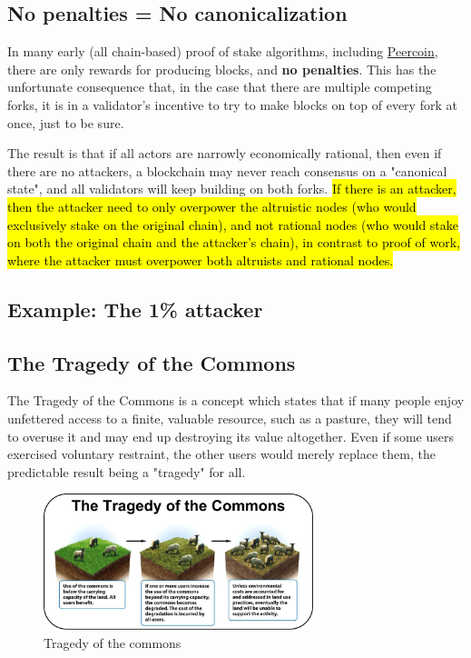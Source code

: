 \subsection{No penalties = No canonicalization}

In many early (all chain-based) proof of stake algorithms, including \href{https://www.peercoin.net/}{Peercoin}, there are only rewards for producing blocks, and \textbf{no penalties}. This has the unfortunate consequence that, in the case that there are multiple competing forks, it is in a validator's incentive to try to make blocks on top of every fork at once, just to be sure.

The result is that if all actors are narrowly economically rational, then even if there are no attackers, a blockchain may never reach consensus on a "canonical state", and all validators will keep building on both forks. \hl{If there is an attacker, then the attacker need to only overpower the altruistic nodes (who would exclusively stake on the original chain), and not rational nodes (who would stake on both the original chain and the attacker's chain), in contrast to proof of work, where the attacker must overpower both altruists and rational nodes.}

\subsection{Example: The 1\% attacker}

\subsection{The Tragedy of the Commons}
The Tragedy of the Commons is a concept which states that if many people enjoy unfettered access to a finite, valuable resource, such as a pasture, they will tend to overuse it and may end up destroying its value altogether. Even if some users exercised voluntary restraint, the other users would merely replace them, the predictable result being a "tragedy" for all.

\begin{figure}
    \centering
    \includegraphics[width=0.70\textwidth]{general-problems/assets/tragedy-of-the-commons.png}
    \caption{Tragedy of the commons}
    \label{fig:tragedy-of-the-commons}
\end{figure}

